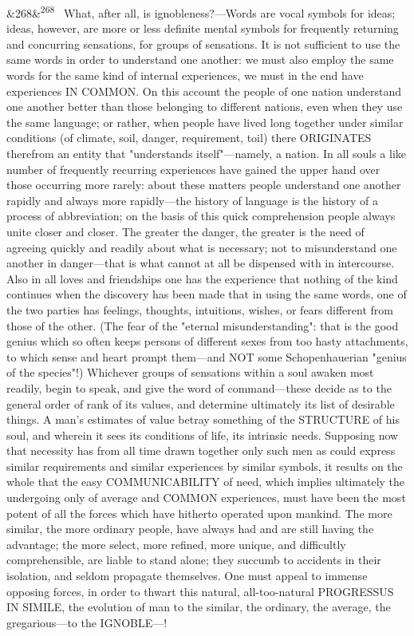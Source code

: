 \documentclass[12pt]{article}
\newcommand{\para}[1][]{\par\noindent\ifx&#1&\else\textsuperscript{\footnotesize #1}~\fi}
\begin{document}
\para[268] What, after all, is ignobleness?---Words are vocal symbols for ideas; ideas, however, are more or less definite mental symbols for frequently returning and concurring sensations, for groups of sensations. It is not sufficient to use the same words in order to understand one another: we must also employ the same words for the same kind of internal experiences, we must in the end have experiences IN COMMON. On this account the people of one nation understand one another better than those belonging to different nations, even when they use the same language; or rather, when people have lived long together under similar conditions (of climate, soil, danger, requirement, toil) there ORIGINATES therefrom an entity that "understands itself"---namely, a nation. In all souls a like number of frequently recurring experiences have gained the upper hand over those occurring more rarely: about these matters people understand one another rapidly and always more rapidly---the history of language is the history of a process of abbreviation; on the basis of this quick comprehension people always unite closer and closer. The greater the danger, the greater is the need of agreeing quickly and readily about what is necessary; not to misunderstand one another in danger---that is what cannot at all be dispensed with in intercourse. Also in all loves and friendships one has the experience that nothing of the kind continues when the discovery has been made that in using the same words, one of the two parties has feelings, thoughts, intuitions, wishes, or fears different from those of the other. (The fear of the "eternal misunderstanding": that is the good genius which so often keeps persons of different sexes from too hasty attachments, to which sense and heart prompt them---and NOT some Schopenhauerian "genius of the species"!) Whichever groups of sensations within a soul awaken most readily, begin to speak, and give the word of command---these decide as to the general order of rank of its values, and determine ultimately its list of desirable things. A man's estimates of value betray something of the STRUCTURE of his soul, and wherein it sees its conditions of life, its intrinsic needs. Supposing now that necessity has from all time drawn together only such men as could express similar requirements and similar experiences by similar symbols, it results on the whole that the easy COMMUNICABILITY of need, which implies ultimately the undergoing only of average and COMMON experiences, must have been the most potent of all the forces which have hitherto operated upon mankind. The more similar, the more ordinary people, have always had and are still having the advantage; the more select, more refined, more unique, and difficultly comprehensible, are liable to stand alone; they succumb to accidents in their isolation, and seldom propagate themselves. One must appeal to immense opposing forces, in order to thwart this natural, all-too-natural PROGRESSUS IN SIMILE, the evolution of man to the similar, the ordinary, the average, the gregarious---to the IGNOBLE---!
\end{document}
